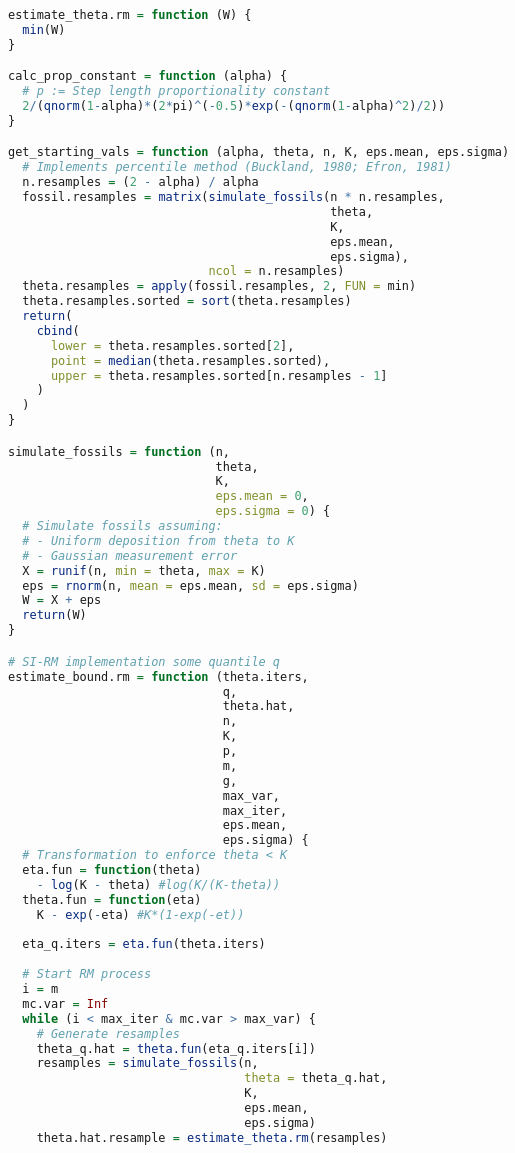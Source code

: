 \begin{lstlisting}[language=R, caption = {Code for implementing SI-RM.}]
estimate_theta.rm = function (W) {
  min(W)
}

calc_prop_constant = function (alpha) {
  # p := Step length proportionality constant
  2/(qnorm(1-alpha)*(2*pi)^(-0.5)*exp(-(qnorm(1-alpha)^2)/2))
}

get_starting_vals = function (alpha, theta, n, K, eps.mean, eps.sigma) {
  # Implements percentile method (Buckland, 1980; Efron, 1981)
  n.resamples = (2 - alpha) / alpha
  fossil.resamples = matrix(simulate_fossils(n * n.resamples,
                                             theta,
                                             K,
                                             eps.mean,
                                             eps.sigma),
                            ncol = n.resamples)
  theta.resamples = apply(fossil.resamples, 2, FUN = min)
  theta.resamples.sorted = sort(theta.resamples)
  return(
    cbind(
      lower = theta.resamples.sorted[2],
      point = median(theta.resamples.sorted),
      upper = theta.resamples.sorted[n.resamples - 1]
    )
  )
}

simulate_fossils = function (n,
                             theta,
                             K,
                             eps.mean = 0,
                             eps.sigma = 0) {
  # Simulate fossils assuming:
  # - Uniform deposition from theta to K
  # - Gaussian measurement error
  X = runif(n, min = theta, max = K)
  eps = rnorm(n, mean = eps.mean, sd = eps.sigma)
  W = X + eps
  return(W)
}

# SI-RM implementation some quantile q
estimate_bound.rm = function (theta.iters,
                              q,
                              theta.hat,
                              n,
                              K,
                              p,
                              m,
                              g,
                              max_var,
                              max_iter,
                              eps.mean,
                              eps.sigma) {
  # Transformation to enforce theta < K
  eta.fun = function(theta)
    - log(K - theta) #log(K/(K-theta))
  theta.fun = function(eta)
    K - exp(-eta) #K*(1-exp(-et))
  
  eta_q.iters = eta.fun(theta.iters)
  
  # Start RM process
  i = m
  mc.var = Inf
  while (i < max_iter & mc.var > max_var) {
    # Generate resamples
    theta_q.hat = theta.fun(eta_q.iters[i])
    resamples = simulate_fossils(n,
                                 theta = theta_q.hat,
                                 K,
                                 eps.mean,
                                 eps.sigma)
    theta.hat.resample = estimate_theta.rm(resamples)
    

\end{lstlisting}
